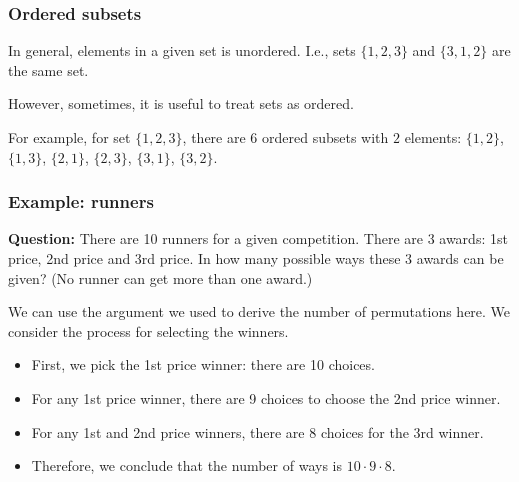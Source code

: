 \begin{frame}\frametitle{Ordered subsets}
  In general, elements in a given set is unordered.  I.e., sets
  $\{1,2,3\}$ and $\{3,1,2\}$ are the same set. \pause

  However, sometimes, it is useful to treat sets as ordered. \pause

  For example, for set $\{1,2,3\}$, there are $6$ ordered subsets with
  $2$ elements: $\{1,2\}$, $\{1,3\}$, $\{2,1\}$, $\{2,3\}$, $\{3,1\}$,
  $\{3,2\}$.
\end{frame}

\begin{frame}\frametitle{Example: runners}
  \begin{tcolorbox}
    {\bf Question:} There are 10 runners for a given competition.
    There are 3 awards: 1st price, 2nd price and 3rd price.  In how
    many possible ways these 3 awards can be given?  (No runner can
    get more than one award.)
  \end{tcolorbox}
  \pause

  We can use the argument we used to derive the number of permutations
  here.  We consider the process for selecting the winners. \pause
  
  \begin{itemize}
  \item First, we pick the 1st price winner: there are 10 choices. \pause
  \item For any 1st price winner, there are 9 choices to choose the
    2nd price winner. \pause
  \item For any 1st and 2nd price winners, there are 8 choices for the
    3rd winner. \pause
  \item Therefore, we conclude that the number of ways is $10\cdot
    9\cdot 8$.
  \end{itemize}
\end{frame}

